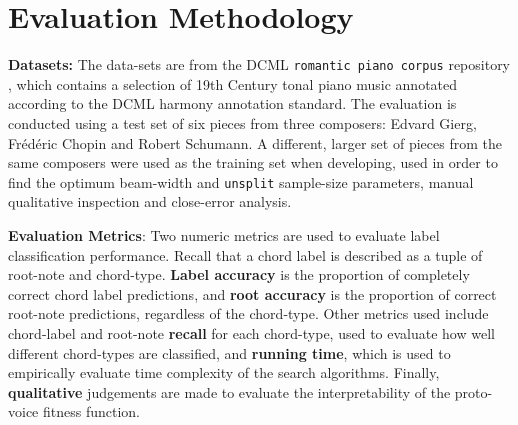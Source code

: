 \documentclass[12pt,a4paper,twoside,openany]{report} \usepackage[pdfborder={0 0 0}]{hyperref}    %
\theoremstyle{definition} \newtheorem{definition}{Definition}[section]
\begin{document}
%
\section{Evaluation Methodology}

\textbf{Datasets:} The data-sets are from the DCML \texttt{romantic piano corpus} repository
\cite{hentschelAnnotatedCorpusTonal2022}, which contains a selection of 19th Century tonal piano music annotated
according to the DCML harmony annotation standard.
The evaluation is conducted using a test set of six pieces from three composers: Edvard Gierg, Frédéric Chopin and Robert Schumann. 
A different, larger set of pieces from the same composers were used as the training set when developing, used in order
to find the optimum beam-width and \texttt{unsplit} sample-size
parameters, manual qualitative inspection and close-error analysis. 

\textbf{Evaluation Metrics}: Two numeric metrics are used to evaluate label classification performance. Recall that a chord label is described as
a tuple of root-note and chord-type. \textbf{Label accuracy} is the proportion of completely correct chord label
predictions, and \textbf{root accuracy} is the proportion of correct root-note predictions, regardless of the
chord-type. Other metrics used include chord-label and root-note \textbf{recall} for each chord-type, used to evaluate
how well different chord-types are classified, and \textbf{running time}, which is used to empirically evaluate time complexity of the
search algorithms. Finally, \textbf{qualitative} judgements are made to evaluate the interpretability of the proto-voice fitness
function.
\end{document}
